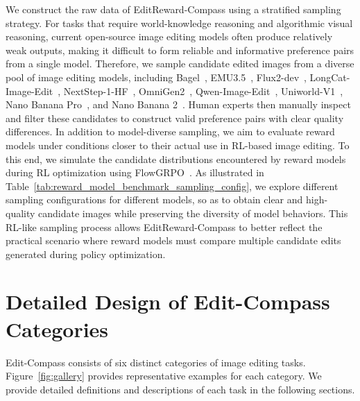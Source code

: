 \documentclass{llmxive}
\providecommand{\bench}{Edit-Compass}
\providecommand{\rmbench}{EditReward-Compass}
\begin{document}
We construct the raw data of {\rmbench} using a stratified sampling strategy. For tasks that require world-knowledge reasoning and algorithmic visual reasoning, current open-source image editing models often produce relatively weak outputs, making it difficult to form reliable and informative preference pairs from a single model. Therefore, we sample candidate edited images from a diverse pool of image editing models, including Bagel~\cite{deng2025emerging}, EMU3.5~\cite{cui2025emu3}, Flux2-dev~\cite{flux-2-2025}, LongCat-Image-Edit~\cite{team2025longcat}, NextStep-1-HF~\cite{han2025nextstep}, OmniGen2~\cite{wu2025omnigen2}, Qwen-Image-Edit~\cite{wu2025qwen}, Uniworld-V1~\cite{lin2025uniworld}, Nano Banana Pro~\cite{nanobananapro}, and Nano Banana 2~\cite{google2026gemini31propreview}. Human experts then manually inspect and filter these candidates to construct valid preference pairs with clear quality differences.
In addition to model-diverse sampling, we aim to evaluate reward models under conditions closer to their actual use in RL-based image editing. To this end, we simulate the candidate distributions encountered by reward models during RL optimization using FlowGRPO~\cite{liu2025flow}. As illustrated in Table~\ref{tab:reward_model_benchmark_sampling_config}, we explore different sampling configurations for different models, so as to obtain clear and high-quality candidate images while preserving the diversity of model behaviors. This RL-like sampling process allows {\rmbench} to better reflect the practical scenario where reward models must compare multiple candidate edits generated during policy optimization.

\section{Detailed Design of {\bench} Categories}
{\bench} consists of six distinct categories of image editing tasks. Figure~\ref{fig:gallery} provides representative examples for each category. We provide detailed definitions and descriptions of each task in the following sections.
\end{document}
